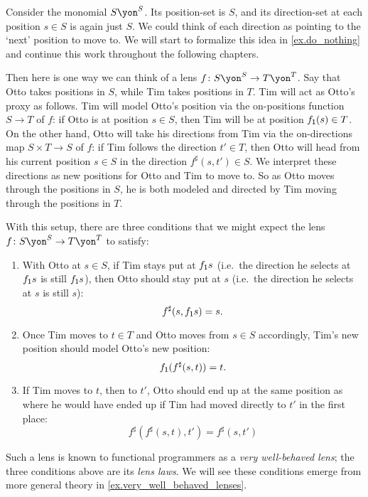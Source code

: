 \documentclass[Book-Poly]{subfiles}
\begin{document}
\begin{example} \label{ex.lens_get_put}
  Consider the monomial $S\yon^S$.
  Its position-set is $S$, and its direction-set at each position $s\in S$ is again just $S$.
  We could think of each direction as pointing to the `next' position to move to.
  We will start to formalize this idea in \cref{ex.do_nothing} and continue this work throughout the following chapters.

  Then here is one way we can think of a lens $f\colon S\yon^S\to T\yon^T$.
  Say that Otto takes positions in $S$, while Tim takes positions in $T$.
  Tim will act as Otto's proxy as follows.
  Tim will model Otto's position via the on-positions function $S\to T$ of $f$: if Otto is at position $s\in S$, then Tim will be at position $f_{\textsf{1}}(s)\in T$.
  On the other hand, Otto will take his directions from Tim via the on-directions map $S\times T\to S$ of $f$: if Tim follows the direction $t'\in T$, then Otto will head from his current position $s\in S$ in the direction $f^\sharp(s,t')\in S$.
  We interpret these directions as new positions for Otto and Tim to move to.
  So as Otto moves through the positions in $S$, he is both modeled and directed by Tim moving through the positions in $T$.

  With this setup, there are three conditions that we might expect the lens $f\colon S\yon^S\to T\yon^T$ to satisfy:
  \begin{enumerate}
    \item With Otto at $s\in S$, if Tim stays put at $f_{\textsf{1}}s$ (i.e.\ the direction he selects at $f_{\textsf{1}}s$ is still $f_{\textsf{1}}s$), then Otto should stay put at $s$ (i.e.\ the direction he selects at $s$ is still $s$):
    \[
      f^\sharp(s,f_{\textsf{1}}s)=s.
    \]

    \item Once Tim moves to $t\in T$ and Otto moves from $s\in S$ accordingly, Tim's new position should model Otto's new position:
    \[
      f_{\textsf{1}}(f^\sharp(s,t))=t.
    \]

    \item If Tim moves to $t$, then to $t'$, Otto should end up at the same position as where he would have ended up if Tim had moved directly to $t'$ in the first place:
    \[
      f^\sharp(f^\sharp(s,t),t')=f^\sharp(s,t')
    \]
  \end{enumerate}
  Such a lens is known to functional programmers as a \emph{very well-behaved lens}; the three conditions above are its \emph{lens laws}.
  We will see these conditions emerge from more general theory in \cref{ex.very_well_behaved_lenses}.
\end{example}
\end{document}
